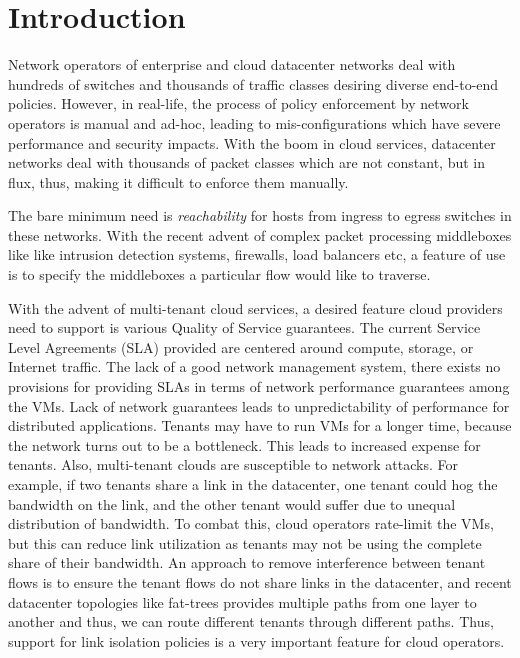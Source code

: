 \documentclass[]{sig}
\begin{document}

\section{Introduction}
Network operators of enterprise and cloud datacenter networks deal with hundreds of switches and thousands of traffic classes desiring diverse end-to-end policies. However, in real-life, the process of policy enforcement by network operators is manual and ad-hoc, leading to mis-configurations which have severe performance and security impacts. With the boom in cloud services, datacenter networks deal with thousands of packet classes which are not constant, but in flux, thus, making it difficult to enforce them manually. 

The bare minimum need is \emph{reachability} for hosts from ingress to egress switches in these networks. 
 With the recent advent of complex packet processing middleboxes like like intrusion detection systems, firewalls, load balancers etc, a feature of use is to specify the middleboxes a particular flow would like to traverse. 

With the advent of multi-tenant cloud services, a desired feature cloud providers need to support is various Quality of Service guarantees. The current Service Level Agreements (SLA) provided are centered around compute, storage, or Internet traffic. The lack of a good network management system, there exists no provisions for providing SLAs in terms of network performance guarantees among the VMs. Lack of network guarantees leads to unpredictability of performance for distributed applications. Tenants may have to run VMs for a longer time, because the network turns out to be a bottleneck. This leads to increased expense for tenants. Also, multi-tenant clouds are susceptible to network attacks. For example, if two tenants share a link in the datacenter, one tenant could hog the bandwidth on the link, and the other tenant would suffer due to unequal distribution of bandwidth. To combat this, cloud operators rate-limit the VMs, but this can reduce link utilization as tenants may not be using the complete share of their bandwidth. An approach to remove interference between tenant flows is to ensure the tenant flows do not share links in the datacenter, and recent datacenter topologies like fat-trees provides multiple paths from one layer to another and thus, we can route different tenants through different paths. Thus, support for link isolation policies is a very important feature for cloud operators. 
\end{document}
